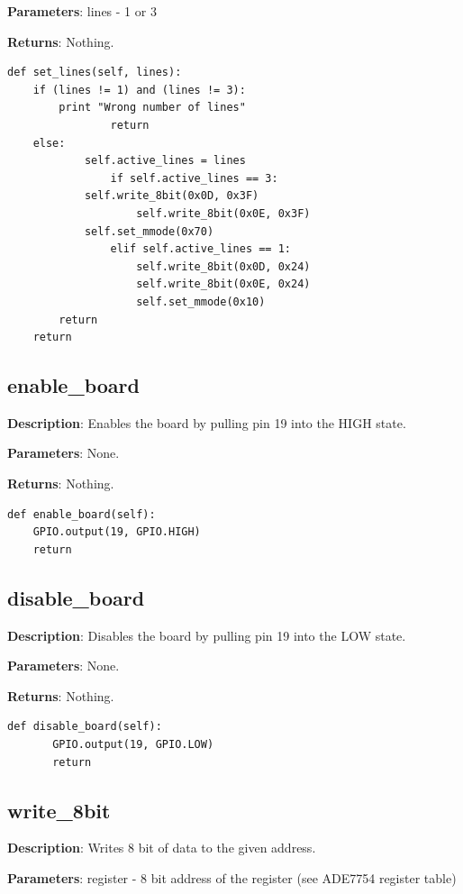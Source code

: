\documentclass{scrartcl}  %
\begin{document}
\textbf{Parameters}: lines - 1 or 3

\textbf{Returns}: Nothing.
\begin{lstlisting}
def set_lines(self, lines):
	if (lines != 1) and (lines != 3):
       	print "Wrong number of lines"
            	return
	else:
           	self.active_lines = lines
            	if self.active_lines == 3:
			self.write_8bit(0x0D, 0x3F)
                	self.write_8bit(0x0E, 0x3F)
			self.set_mmode(0x70)
            	elif self.active_lines == 1:
            		self.write_8bit(0x0D, 0x24)
            		self.write_8bit(0x0E, 0x24)	
            		self.set_mmode(0x10)				
		return
	return
\end{lstlisting}

\subsection{enable_board}

\textbf{Description}: Enables the board by pulling pin 19 into the HIGH state.

\textbf{Parameters}: None.

\textbf{Returns}: Nothing.

\begin{lstlisting}	
def enable_board(self):
	GPIO.output(19, GPIO.HIGH)
	return
\end{lstlisting}

\subsection{disable_board}

\textbf{Description}: Disables the board by pulling pin 19 into the LOW state.

\textbf{Parameters}: None.

\textbf{Returns}: Nothing.

\begin{lstlisting}
def disable_board(self):
       GPIO.output(19, GPIO.LOW)
       return
\end{lstlisting}

\subsection{write_8bit}    

\textbf{Description}: Writes 8 bit of data to the given address.

\textbf{Parameters}: register - 8 bit address of the register (see ADE7754 register table)
\end{document}
